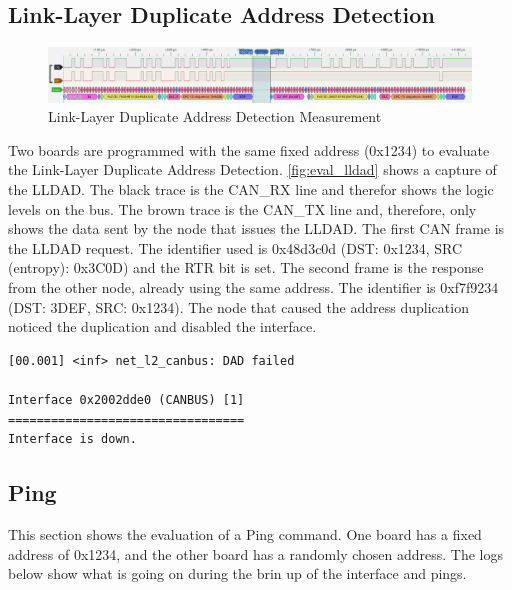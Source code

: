 \subsection{Link-Layer Duplicate Address Detection}

\begin{figure}[htp]
        \begin{center}
                \includegraphics[width=\textwidth]{figures/eval_dad_logic.png}
        \end{center}
        \caption{Link-Layer Duplicate Address Detection Measurement}
        \label{fig:eval_lldad}
\end{figure}

Two boards are programmed with the same fixed address (0x1234) to evaluate the Link-Layer Duplicate Address Detection.
\autoref{fig:eval_lldad} shows a capture of the LLDAD.
The black trace is the CAN\_RX line and therefor shows the logic levels on the bus.
The brown trace is the CAN\_TX line and, therefore, only shows the data sent by the node that issues the LLDAD.
The first CAN frame is the LLDAD request. The identifier used is 0x48d3c0d (DST: 0x1234, SRC (entropy): 0x3C0D) and the RTR bit is set.
The second frame is the response from the other node, already using the same address.
The identifier is 0xf7f9234 (DST: 3DEF, SRC: 0x1234).
The node that caused the address duplication noticed the duplication and disabled the interface.

\begin{lstlisting}[numbers=none, basicstyle=\tiny]
[00.001] <inf> net_l2_canbus: DAD failed

Interface 0x2002dde0 (CANBUS) [1]
=================================
Interface is down.
\end{lstlisting}
\newpage

\subsection{Ping}
This section shows the evaluation of a Ping command.
One board has a fixed address of 0x1234, and the other board has a randomly chosen address.
The logs below show what is going on during the brin up of the interface and pings.

